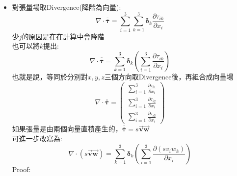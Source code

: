 \documentclass[../main.tex]{subfiles}
\begin{document}
\begin{itemize}
\begin{itemize}
\begin{align}
          \frac{\partial u_j}{\partial x_i}
        \end{align}
        P.S. 可以將其轉置:
        \begin{equation}
          \left(\nabla \vec {\bm u}\right)^\dagger = \sum_{i=1}^3 \sum_{j=1}^3 \bm \delta_i \bm \delta_j \frac{\partial u_i}{\partial x_j}
        \end{equation}
        可以注意到轉置前後不同:
        \begin{equation}
          \boxed{\frac{\partial u_j}{\partial x_i} \neq \frac{\partial u_i}{\partial x_j}}
        \end{equation}
      \item 對張量場取Divergence(降階為向量):
        \begin{equation}
          \boxed{\nabla \cdot \overline{\overline{\bm \tau}} = 
          \sum_{i=1}^3\sum_{k=1}^3 \bm \delta_k \frac{\partial \tau_{ik}}{\partial x_i}}
        \end{equation}
        少$j$的原因是在在計算中會降階\\
        也可以將$k$提出:
        \begin{equation}
          \nabla \cdot \overline{\overline{\bm \tau}} = \sum_{k=1}^3 \bm \delta_k \left(
            \sum_{i=1}^3 \frac{\partial \tau_{ik}}{\partial x_i}
          \right)
        \end{equation}
        也就是說，等同於分別對$x,y,z$三個方向取Divergence後，再組合成向量場
        \begin{equation}
          \nabla \cdot \overline{\overline{\bm \tau}} = \begin{pmatrix}
            \sum_{i=1}^3 \frac{\partial \tau_{i1}}{\partial x_i} \\
            \sum_{i=1}^3 \frac{\partial \tau_{i2}}{\partial x_i} \\
            \sum_{i=1}^3 \frac{\partial \tau_{i3}}{\partial x_i}
          \end{pmatrix}
        \end{equation}
        如果張量是由兩個向量直積產生的，$\overline{\overline{\bm \tau}} = s\vec {\bm v} \vec {\bm w}$\\
        可進一步改寫為:
        \begin{equation}
          \nabla \cdot (s \vec {\bm v} \vec {\bm w}) = \sum_{k=1}^3 \bm \delta_k \left(
            \sum_{i=1}^3 \frac{\partial (s v_i w_k)}{\partial x_i}
          \right)
        \end{equation}
        Proof:
        \begin{align}

\end{align}
\end{itemize}
\end{itemize}
\end{document}
